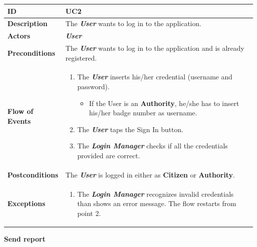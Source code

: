 \documentclass{report}
\begin{document}
\begin{tabularx}{\linewidth}{| l | X |}
	\hline
	\textbf{ID} & UC2\\
	
	\hline
	\textbf{Description} & The \textbf{\textit{User}} wants to log in to the application.\\
	
	\hline
	\textbf{Actors} & \textbf{\textit{User}}\\
	
	\hline
	\textbf{Preconditions} & The \textbf{\textit{User}} wants to log in to the application and is already registered.\\
	
	\hline
	\textbf{Flow of Events} & \parbox{0.7\textwidth}{\begin{enumerate}
			\item The \textbf{\textit{User}} inserts his/her credential (username and password).
			\begin{itemize}
			\item If the User is an \textbf{Authority}, he/she has to insert his/her badge number as username.
			\end{itemize}
			\item The \textbf{\textit{User}} taps the Sign In button.			
			\item The \textbf{\textit{Login Manager}} checks if all the credentials provided are correct.
			
			
	\end{enumerate}}\\
	
	\hline
	\textbf{Postconditions} & The \textbf{\textit{User}} is logged in either as \textbf{Citizen} or \textbf{Authority}.\\
	
	\hline
	\textbf{Exceptions} & \parbox{0.7\textwidth}{ \begin{enumerate}
			\item The \textbf{\textit{Login Manager}} recognizes invalid credentials than shows an error message. The flow restarts from point 2. 
		\end{enumerate}}\\
	
	\hline
\end{tabularx}
\begin{center}
	\textbf{Send report}
\end{center}
\end{document}
